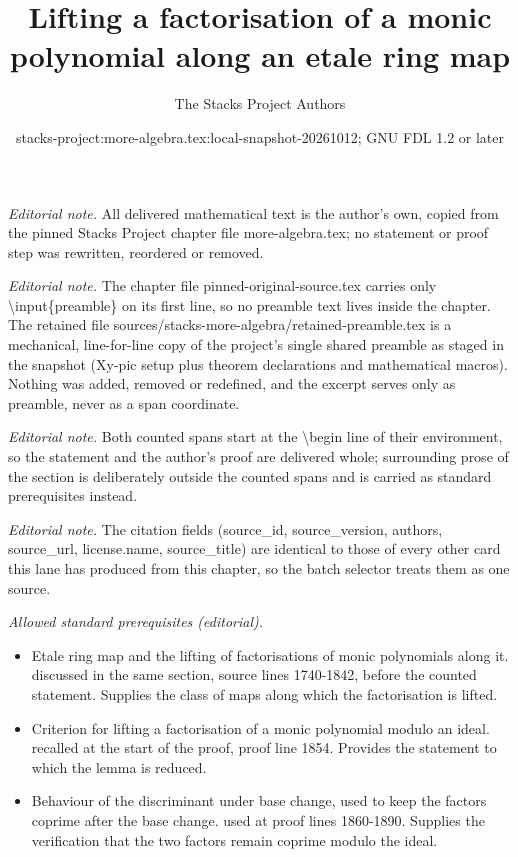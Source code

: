 \documentclass[10pt,a4paper]{amsart}
\title{Lifting a factorisation of a monic polynomial along an etale ring map}
\author{The Stacks Project Authors}
\date{stacks-project:more-algebra.tex:local-snapshot-20261012; GNU FDL 1.2 or later}
\theoremstyle{plain}
\theoremstyle{definition}
\theoremstyle{remark}
\numberwithin{equation}{subsection}
\begin{document}
\maketitle
\setcounter{subsection}{1}
\noindent\textit{Editorial note.} All delivered mathematical text is the author's own, copied from the pinned Stacks Project chapter file more-algebra.tex; no statement or proof step was rewritten, reordered or removed.\par\medskip
\noindent\textit{Editorial note.} The chapter file pinned-original-source.tex carries only \textbackslash{}input\{preamble\} on its first line, so no preamble text lives inside the chapter. The retained file sources/stacks-more-algebra/retained-preamble.tex is a mechanical, line-for-line copy of the project's single shared preamble as staged in the snapshot (Xy-pic setup plus theorem declarations and mathematical macros). Nothing was added, removed or redefined, and the excerpt serves only as preamble, never as a span coordinate.\par\medskip
\noindent\textit{Editorial note.} Both counted spans start at the \textbackslash{}begin line of their environment, so the statement and the author's proof are delivered whole; surrounding prose of the section is deliberately outside the counted spans and is carried as standard prerequisites instead.\par\medskip
\noindent\textit{Editorial note.} The citation fields (source\_id, source\_version, authors, source\_url, license.name, source\_title) are identical to those of every other card this lane has produced from this chapter, so the batch selector treats them as one source.\par\medskip
\noindent\textit{Allowed standard prerequisites (editorial).}\begin{itemize}
\item Etale ring map and the lifting of factorisations of monic polynomials along it. discussed in the same section, source lines 1740-1842, before the counted statement. Supplies the class of maps along which the factorisation is lifted.
\item Criterion for lifting a factorisation of a monic polynomial modulo an ideal. recalled at the start of the proof, proof line 1854. Provides the statement to which the lemma is reduced.
\item Behaviour of the discriminant under base change, used to keep the factors coprime after the base change. used at proof lines 1860-1890. Supplies the verification that the two factors remain coprime modulo the ideal.
\end{itemize}\medskip
\end{document}
